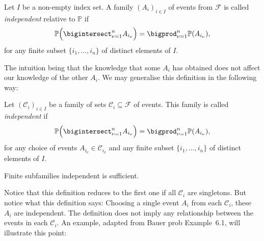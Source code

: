 \documentclass[article, a4paper, 11pt, oneside]{memoir}
\numberwithin{equation}{chapter}
\newcommand{\calF}{\mathcal{F}}
\newcommand{\calC}{\mathcal{C}}
\renewcommand{\P}{\mathbb{P}}
\begin{document}
\begin{definition}[Independence I]
    \label{def:independence-1}
    Let $I$ be a non-empty index set. A family $(A_i)_{i \in I}$ of events from $\calF$ is called \emph{independent} relative to $\P$ if
    \begin{equation*}
        \P \Bigl( \bigintersect_{\nu = 1}^n A_{i_\nu} \Bigr)
            = \bigprod_{\nu = 1}^n \P(A_{i_\nu}),
    \end{equation*}
    for any finite subset $\{ i_1, \ldots, i_n \}$ of distinct elements of $I$.
\end{definition}
%
The intuition being that the knowledge that some $A_i$ has obtained does not affect our knowledge of the other $A_i$. We may generalise this definition in the following way:

\begin{definition}[Independence II]
    Let $(\calC_i)_{i \in I}$ be a family of sets $\calC_i \subseteq \calF$ of events. This family is called \emph{independent} if
    \begin{equation*}
        \P \Bigl( \bigintersect_{\nu = 1}^n A_{i_\nu} \Bigr)
            = \bigprod_{\nu = 1}^n \P(A_{i_\nu}),
    \end{equation*}
    for any choice of events $A_{i_\nu} \in \calC_{i_\nu}$ and any finite subset $\{ i_1, \ldots, i_n \}$ of distinct elements of $I$.
\end{definition}

\begin{remark}
    \label{rem:finite-subfamilies-independent}
    Finite subfamilies independent is sufficient.
\end{remark}
%
Notice that this definition reduces to the first one if all $\calC_i$ are singletons. But notice what this definition says: Choosing a single event $A_i$ from each $\calC_i$, these $A_i$ are independent. The definition does not imply any relationship between the events in each $\calC_i$. An example, adapted from Bauer prob Example~6.1, will illustrate this point:

\newcommand{\powerset}[1]{2^{#1}}
\end{document}
